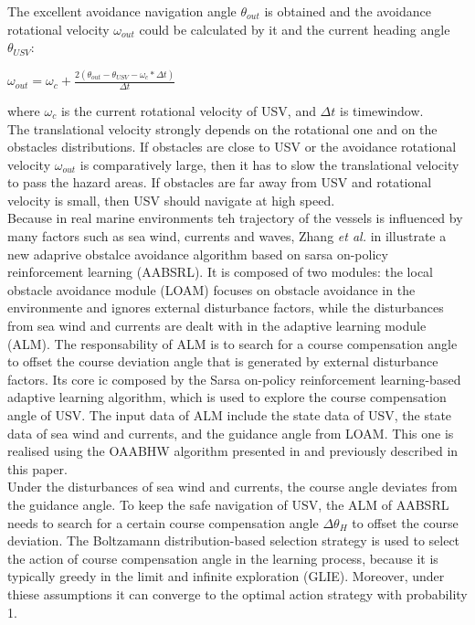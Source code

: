 \documentclass[journal]{IEEEtran}
\begin{document}
              The excellent avoidance navigation angle $\theta_{out}$ is obtained and the avoidance rotational velocity $\omega_{out}$ could be calculated by it and the current heading angle $\theta_{USV}$:
                  \begin{center}
                        $\omega_{out} = \omega_c + \frac{2(\theta_{out} - \theta_{USV} -\omega_c * \Delta t)}{\Delta t}$
                  \end{center}
              where $\omega_c$ is the current rotational velocity of USV, and $\Delta t$ is time\-window.\\
              The translational velocity strongly depends on the rotational one and on the obstacles distributions. If obstacles are close to USV or the avoidance rotational velocity $\omega_{out}$ is comparatively large, then it has to slow the translational velocity to pass the hazard areas. If obstacles are far away from USV and rotational velocity is small, then USV should navigate at high speed.\\

              \indent Because in real marine environments teh trajectory of the vessels is influenced by many factors such as sea wind, currents and waves, Zhang \textit{et al.} in \cite{Zhang2014} illustrate a new adaprive obstalce avoidance algorithm based on sarsa on-policy reinforcement learning (AABSRL). It is composed of two modules: the local obstacle avoidance module (LOAM) focuses on obstacle avoidance in the environmente and ignores external disturbance factors, while the disturbances from sea wind and currents are dealt with in the adaptive learning module (ALM). The responsability of ALM is to search for a course compensation angle to offset the course deviation angle that is generated by external disturbance factors. Its core ic composed by the Sarsa on-policy reinforcement learning-based adaptive learning algorithm, which is used to explore the course compensation angle of USV. The input data of ALM include the state data of USV, the state data of sea wind and currents, and the guidance angle from LOAM. This one is realised using the OAABHW algorithm presented in \cite{Tang2012} and previously described in this paper.\\
              Under the disturbances of sea wind and currents, the course angle deviates from the guidance angle. To keep the safe navigation of USV, the ALM of AABSRL needs to search for a certain course compensation angle $\Delta \theta_H $ to offset the course deviation. The Boltzamann distribution-based selection strategy is used to select the action of course compensation angle in the learning process, because it is typically greedy in the limit and infinite exploration (GLIE). Moreover, under thiese assumptions it can converge to the optimal action strategy with probability 1.
\end{document}
